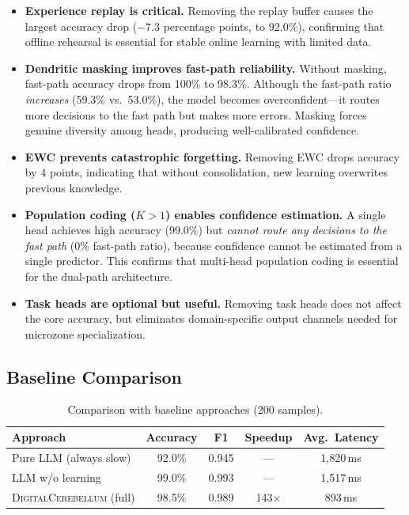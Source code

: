 \documentclass[11pt,a4paper]{article}
\newcommand{\cb}{\textsc{DigitalCerebellum}}
\begin{document}
\begin{itemize}[nosep]
\item \textbf{Experience replay is critical.}
  Removing the replay buffer causes the largest accuracy drop ($-7.3$ percentage points, to 92.0\%), confirming that offline rehearsal is essential for stable online learning with limited data.

\item \textbf{Dendritic masking improves fast-path reliability.}
  Without masking, fast-path accuracy drops from 100\% to 98.3\%.
  Although the fast-path ratio \emph{increases} (59.3\% vs.\ 53.0\%), the model becomes overconfident---it routes more decisions to the fast path but makes more errors.
  Masking forces genuine diversity among heads, producing well-calibrated confidence.

\item \textbf{EWC prevents catastrophic forgetting.}
  Removing EWC drops accuracy by 4 points, indicating that without consolidation, new learning overwrites previous knowledge.

\item \textbf{Population coding ($K>1$) enables confidence estimation.}
  A single head achieves high accuracy (99.0\%) but \emph{cannot route any decisions to the fast path} (0\% fast-path ratio), because confidence cannot be estimated from a single predictor.
  This confirms that multi-head population coding is essential for the dual-path architecture.

\item \textbf{Task heads are optional but useful.}
  Removing task heads does not affect the core accuracy, but eliminates domain-specific output channels needed for microzone specialization.
\end{itemize}

\subsection{Baseline Comparison}\label{sec:baselines}

\begin{table}[t]
\centering
\caption{Comparison with baseline approaches (200 samples).}
\label{tab:baseline}
\begin{tabular}{lcccc}
\toprule
Approach & Accuracy & F1 & Speedup & Avg.\ Latency \\
\midrule
Pure LLM (always slow) & 92.0\% & 0.945 & --- & 1,820\,ms \\
LLM w/o learning & 99.0\% & 0.993 & --- & 1,517\,ms \\
\cb{} (full) & 98.5\% & 0.989 & 143$\times$ & 893\,ms \\
\bottomrule
\end{tabular}
\end{table}
\end{document}
